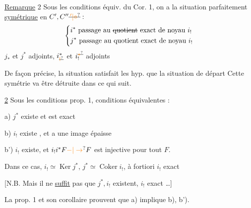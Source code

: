 \uline{Remarque} 2 Sous les conditions équiv. du Cor. 1, on a la situation
parfaitement \uline{symétrique} en $C',C''\deleted{\unsure{\, '|\circ}}:$
\[
\left\{\begin{aligned}
&i^*\ \text{passage au }\deleted{\text{quotient}}\ \text{exact de noyau } i_!\\
&j^*\ \text{passage au quotient exact de noyau }i_!
\end{aligned}\right.
\]
$j_*$ et $j^*$ adjoints, $i_{\deleted{\unsure{!}}}^*$ et $i_{\smash{!}}^{\deleted{\unsure{*}}}$ adjoints

De façon précise, la situation
satisfait les   hyp. que la situation de départ Cette symétrie va être détruite dans ce qui suit.




\uline{  2} Sous les conditions  prop. 1, conditions équivalentes :

a) $j^*$ existe  et est exact

b) $i_!$ existe , et a une image  épaisse

b') $i_!$ existe, et $i_!i^*F\unsure{-|\to}F$ est injective pour tout $F$.

Dans ce cas, $i_!\simeq\operatorname{Ker}j^*$, $j^*\simeq\operatorname{Coker}i_!$, à fortiori $i_!$ exact

[N.B. Mais il ne \uline{suffit} pas que $j^*,i_!$ existent, $i_!$ exact \ldots]

La prop. 1 et son corollaire prouvent que a) implique b), b').



